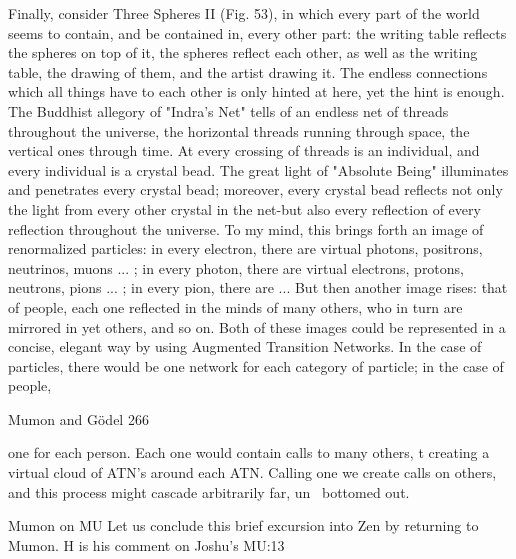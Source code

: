 Finally, consider Three Spheres II (Fig. 53), in which every part of the world seems to
contain, and be contained in, every other part: the writing table reflects the spheres on top
of it, the spheres reflect each other, as well as the writing table, the drawing of them, and
the artist drawing it. The endless connections which all things have to each other is only
hinted at here, yet the hint is enough. The Buddhist allegory of "Indra's Net" tells of an
endless net of threads throughout the universe, the horizontal threads running through
space, the vertical ones through time. At every crossing of threads is an individual, and
every individual is a crystal bead. The great light of "Absolute Being" illuminates and
penetrates every crystal bead; moreover, every crystal bead reflects not only the light
from every other crystal in the net-but also every reflection of every reflection throughout
the universe.
         To my mind, this brings forth an image of renormalized particles: in every
electron, there are virtual photons, positrons, neutrinos, muons ... ; in every photon, there
are virtual electrons, protons, neutrons, pions ... ; in every pion, there are ...
         But then another image rises: that of people, each one reflected in the minds of
many others, who in turn are mirrored in yet others, and so on.
         Both of these images could be represented in a concise, elegant way by using
Augmented Transition Networks. In the case of particles, there would be one network for
each category of particle; in the case of people,




Mumon and Gödel                                                                          266

one for each person. Each one would contain calls to many others, t creating a virtual
cloud of ATN's around each ATN. Calling one we create calls on others, and this process
might cascade arbitrarily far, un~ bottomed out.

                                  Mumon on MU
Let us conclude this brief excursion into Zen by returning to Mumon. H is his comment
on Joshu's MU:13

